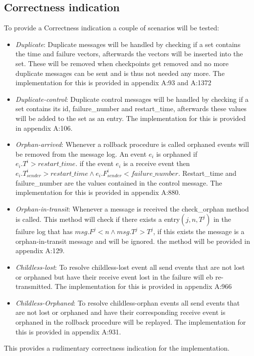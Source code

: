 \documentclass[twocolumn, a4paper,11pt]{article}%
\begin{document}
\subsection{Correctness indication}%
\par To provide a Correctness indication a couple of scenarios will be tested:
\begin{itemize}
	\item \textit{Duplicate}: Duplicate messages will be handled by checking if a set contains the time and failure vectors, afterwards the vectors will be inserted into the set. These will be removed when checkpoints get removed and no more duplicate messages can be sent and is thus not needed any more. The implementation for this is provided in appendix A:93 and A:1372
	\item \textit{Duplicate-control}: Duplicate control messages will be handled by checking if a set contains its id, failure\_number and restart\_time, afterwards these values will be added to the set as an entry. The implementation for this is provided in appendix A:106.
	\item \textit{Orphan-arrived}: Whenever a rollback procedure is called orphaned events will be removed from the message log. An event \(e_i\) is orphaned if \(e_i.T^i > restart\_time\). if the event \(e_i\) is a receive event then \(e_i.T^i_{sender} > restart\_time \land e_i.F^i_{sender} < failure\_number\). Restart\_time and failure\_number are the values contained in the control message. The implementation for this is provided in appendix A:880.
	\item \textit{Orphan-in-transit}: Whenever a message is received the check\_orphan method is called. This method will check if there exists a entry\((j,n,T^{j})\) in the failure log that has \(msg.F^{j} < n \land msg.T^{j} > T^{j}\), if this exists the message is a orphan-in-transit message and will be ignored. the method will be provided in appendix A:129.	
	\item \textit{Childless-lost}:  To resolve childless-lost event all send events that are not lost or orphaned but have their receive event lost in the failure will eb re-transmitted. The implementation for this is provided in appendix A:966
	\item \textit{Childless-Orphaned}: To resolve childless-orphan events all send events that are not lost or orphaned and have their corresponding receive event is orphaned in the rollback procedure will be replayed. The implementation for this is provided in appendix A:931.
\end{itemize}
\par This provides a rudimentary correctness indication for the implementation.
\end{document}
